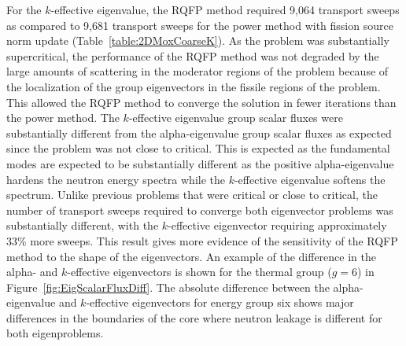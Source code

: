 For the $k$-effective eigenvalue, the RQFP method required 9,064 transport sweeps as compared to 9,681 transport sweeps for the power method with fission source norm update (Table~\ref{table:2DMoxCoarseK}). As the problem was substantially supercritical, the performance of the RQFP method was not degraded by the large amounts of scattering in the moderator regions of the problem because of the localization of the group eigenvectors in the fissile regions of the problem. This allowed the RQFP method to converge the solution in fewer iterations than the power method. The $k$-effective eigenvalue group scalar fluxes were substantially different from the alpha-eigenvalue group scalar fluxes as expected since the problem was not close to critical. This is expected as the fundamental modes are expected to be substantially different as the positive alpha-eigenvalue hardens the neutron energy spectra while the $k$-effective eigenvalue softens the spectrum. Unlike previous problems that were critical or close to critical, the number of transport sweeps required to converge both eigenvector problems was substantially different, with the $k$-effective eigenvector requiring approximately 33\% more sweeps. This result gives more evidence of the sensitivity of the RQFP method to the shape of the eigenvectors. An example of the difference in the alpha- and $k$-effective eigenvectors is shown for the thermal group ($g = 6$) in Figure~\ref{fig:EigScalarFluxDiff}. The absolute difference between the alpha-eigenvalue and $k$-effective eigenvectors for energy group six shows major differences in the boundaries of the core where neutron leakage is different for both eigenproblems.

